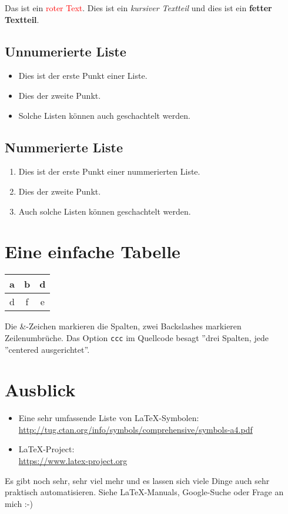 Das ist ein \textcolor{red}{roter Text}. Dies ist ein {\itshape kursiver Textteil} und dies ist ein {\bfseries fetter Textteil}. 

\subsection{Unnumerierte Liste}

\begin{itemize}
	\item Dies ist der erste Punkt einer Liste.
  	\item Dies der zweite Punkt.
  	\item Solche Listen können auch geschachtelt werden.
\end{itemize} 

\subsection{Nummerierte Liste}

\begin{enumerate}
	\item Dies ist der erste Punkt einer nummerierten Liste.
	\item Dies der zweite Punkt.
	\item Auch solche Listen können geschachtelt werden.
\end{enumerate}  		


\section{Eine einfache Tabelle}

\begin{center}
	\begin{tabular}{ccc}
		a & b & d	\\ \hline
		d & f & e
	\end{tabular}
\end{center}

Die \&-Zeichen markieren die Spalten, zwei Backslashes markieren Zeilenumbrüche. Das Option \texttt{ccc} im Quellcode besagt ''drei Spalten, jede ''centered ausgerichtet''. 

\section{Ausblick}

\begin{itemize}
	\item Eine sehr umfassende Liste von LaTeX-Symbolen: \\
		\href{http://tug.ctan.org/info/symbols/comprehensive/symbols-a4.pdf}{http://tug.ctan.org/info/symbols/comprehensive/symbols-a4.pdf}
	\item LaTeX-Project: \\
		\href{https://www.latex-project.org}{https://www.latex-project.org}
\end{itemize}	
		
Es gibt noch sehr, sehr viel mehr und es lassen sich viele Dinge auch sehr praktisch automatisieren. Siehe LaTeX-Manuals, Google-Suche oder Frage an mich :-)
